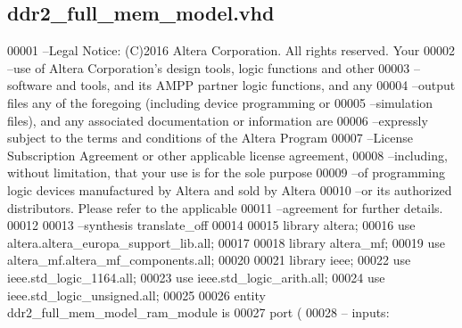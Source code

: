 \subsection{ddr2\+\_\+full\+\_\+mem\+\_\+model.\+vhd}
\label{ddr2__full__mem__model_8vhd_source}

\begin{DoxyCode}
00001 \textcolor{keyword}{--Legal Notice: (C)2016 Altera Corporation. All rights reserved.  Your}
00002 \textcolor{keyword}{--use of Altera Corporation's design tools, logic functions and other}
00003 \textcolor{keyword}{--software and tools, and its AMPP partner logic functions, and any}
00004 \textcolor{keyword}{--output files any of the foregoing (including device programming or}
00005 \textcolor{keyword}{--simulation files), and any associated documentation or information are}
00006 \textcolor{keyword}{--expressly subject to the terms and conditions of the Altera Program}
00007 \textcolor{keyword}{--License Subscription Agreement or other applicable license agreement,}
00008 \textcolor{keyword}{--including, without limitation, that your use is for the sole purpose}
00009 \textcolor{keyword}{--of programming logic devices manufactured by Altera and sold by Altera}
00010 \textcolor{keyword}{--or its authorized distributors.  Please refer to the applicable}
00011 \textcolor{keyword}{--agreement for further details.}
00012 
00013 \textcolor{keyword}{--synthesis translate\_off}
00014 
00015 \textcolor{vhdlkeyword}{library }\textcolor{keywordflow}{altera};
00016 \textcolor{vhdlkeyword}{use }altera.altera\_europa\_support\_lib.\textcolor{keywordflow}{all};
00017 
00018 \textcolor{vhdlkeyword}{library }\textcolor{keywordflow}{altera\_mf};
00019 \textcolor{vhdlkeyword}{use }altera\_mf.altera\_mf\_components.\textcolor{keywordflow}{all};
00020 
00021 \textcolor{vhdlkeyword}{library }\textcolor{keywordflow}{ieee};
00022 \textcolor{vhdlkeyword}{use }ieee.std\_logic\_1164.\textcolor{keywordflow}{all};
00023 \textcolor{vhdlkeyword}{use }ieee.std\_logic\_arith.\textcolor{keywordflow}{all};
00024 \textcolor{vhdlkeyword}{use }ieee.std\_logic\_unsigned.\textcolor{keywordflow}{all};
00025 
00026 \textcolor{keywordflow}{entity }ddr2_full_mem_model_ram_module \textcolor{keywordflow}{is} 
00027         \textcolor{keywordflow}{port} \textcolor{vhdlchar}{(}
00028 \textcolor{keyword}{              -- inputs:}

\end{DoxyCode}
